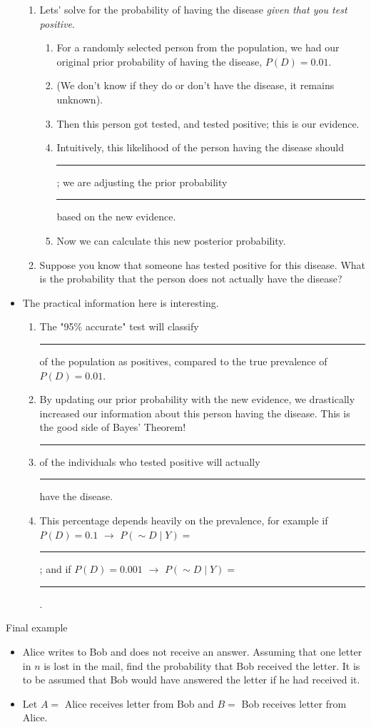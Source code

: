 \documentclass{article}
\newcommand{\blankul}[1]{\rule[-1.5mm]{#1}{0.15mm}}	%
\newcommand{\comp}{{\sim}}						%
\begin{document}
\begin{itemize}
\begin{enumerate}
         \item Lets' solve for the probability of having the disease \textit{given that you test positive}.
        \begin{enumerate}
            \item For a randomly selected person from the population, we had our original prior probability of having the disease, $P(D) = 0.01$.
            \item[] (We don't know if they do or don't have the disease, it remains unknown).\smallskip
            \item Then this person got tested, and tested positive; this is our evidence.\smallskip
            \item[] Intuitively, this likelihood of the person having the disease should \blankul{2cm}; we are adjusting the prior probability \blankul{2cm} based on the new evidence.\smallskip
            \item Now we can calculate this new posterior probability.\vspace{100pt}
        \end{enumerate}
        \item Suppose you know that someone has tested positive for this disease. What is the probability that the person does not actually have the disease?\vspace{90pt}
     \end{enumerate}
     \item The practical information here is interesting.
    \begin{enumerate}
        \item The "95\% accurate" test will classify \blankul{1cm} of the population as positives, compared to the true prevalence of $P(D) = 0.01$.
        \item By updating our prior probability with the new evidence, we drastically increased our information about this person having the disease. This is the good side of Bayes' Theorem! \vspace{20pt}
        \item \blankul{1cm} of the individuals who tested positive will actually \blankul{1cm} have the disease.
        \item[] This percentage depends heavily on the prevalence, for example if \\$P(D) = 0.1$ $\rightarrow$ $P(\comp{D} \mid Y) = $ \blankul{1cm}; and if $P(D) = 0.001$ $\rightarrow$ $P(\comp{D} \mid Y) = $\blankul{1cm}.
    \end{enumerate}
\end{itemize}\bigskip

Final example\bigskip
\begin{itemize}
    \item Alice writes to Bob and does not receive an answer. Assuming that one letter in $n$ is lost in the mail, find the probability that Bob received the letter. It is to be assumed that Bob would have answered the letter if he had received it.
    \item[] Let $A = $ Alice receives letter from Bob and $B = $ Bob receives letter from Alice.\vspace{100pt}
\end{itemize}
\end{document}
